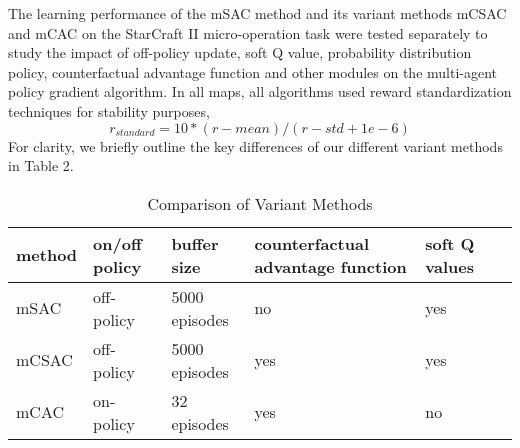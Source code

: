 \documentclass[runningheads]{llncs}
\begin{document}
  The learning performance of the mSAC method and its variant methods mCSAC and mCAC on the StarCraft II micro-operation task were tested separately to study the impact of off-policy update, soft Q value, probability distribution policy, counterfactual advantage function and other modules on the multi-agent policy gradient algorithm.
 In all maps, all algorithms used reward standardization techniques for stability purposes,
\begin{equation}
	r_{standard} = 10 * (r-mean)/(r - std + 1e-6)
\end{equation}
For clarity, we briefly outline the key differences of our different variant methods in Table 2.
\begin{table*}[!htbp]
	\centering
	\caption{Comparison of Variant Methods}
	\begin{tabular}{llllll}
		\hline
		method  & on/off policy  &  buffer size & counterfactual advantage function& soft Q values\\
		\hline
		mSAC &off-policy&5000 episodes&no&yes \\
		mCSAC &off-policy&5000 episodes&yes&yes \\
		mCAC &on-policy&32 episodes&yes &no \\	
		\hline
	\end{tabular}
	\label{tab:booktabs}
\end{table*}
\end{document}
